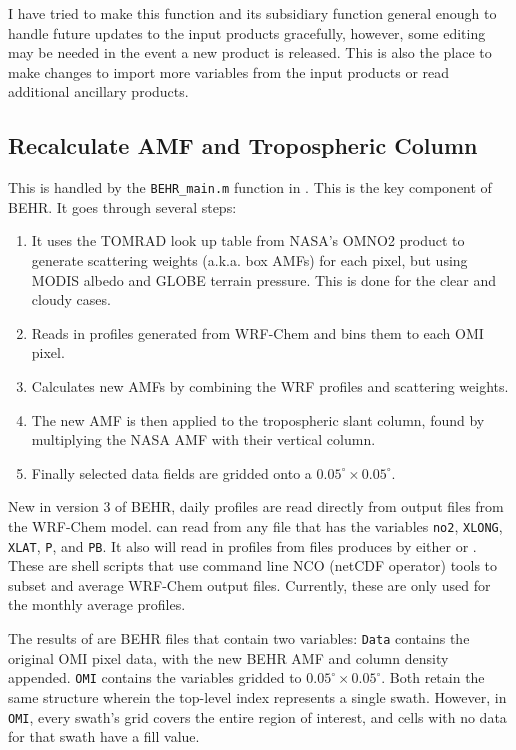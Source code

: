 \documentclass[12pt]{article}
\begin{document}
	I have tried to make this function and its subsidiary function general enough to handle future updates to the input products gracefully, however, some editing may be needed in the event a new product is released. This is also the place to make changes to import more variables from the input products or read additional ancillary products.
	
	\subsection{Recalculate AMF and Tropospheric Column}
	
		This is handled by the \texttt{BEHR\_main.m} function in . This is the key component of BEHR. It goes through several steps:
		\begin{enumerate}
			\item It uses the TOMRAD look up table from NASA's OMNO2 product to generate scattering weights (a.k.a. box AMFs)  for each pixel, but using MODIS albedo and GLOBE terrain pressure.  This is done for the clear and cloudy cases.
			\item Reads in  profiles generated from WRF-Chem and bins them to each OMI pixel.
			\item Calculates new AMFs by combining the WRF profiles and scattering weights.
			\item The new AMF is then applied to the tropospheric slant column, found by multiplying the NASA AMF with their vertical column.
			\item Finally selected data fields are gridded onto a $0.05^\circ \times 0.05^\circ$.  
		\end{enumerate}
		
		New in version 3 of BEHR, daily  profiles are read directly from  output files from the WRF-Chem model.  can read from any  file that has the variables \lstinline$no2$, \lstinline$XLONG$, \lstinline$XLAT$, \lstinline$P$, and \lstinline$PB$. It also will read in profiles from  files produces by either  or . These are shell scripts that use command line NCO (netCDF operator) tools to subset and average WRF-Chem output files. Currently, these are only used for the monthly average profiles.
		
		The results of  are BEHR files that contain two variables: \texttt{Data} contains the original OMI pixel data, with the new BEHR AMF and  column density appended. \texttt{OMI} contains the variables gridded to $0.05^\circ \times 0.05^\circ$. Both retain the same structure wherein the top-level index represents a single swath.  However, in \texttt{OMI}, every swath's grid covers the entire region of interest, and cells with no data for that swath have a fill value.
		
\end{document}
